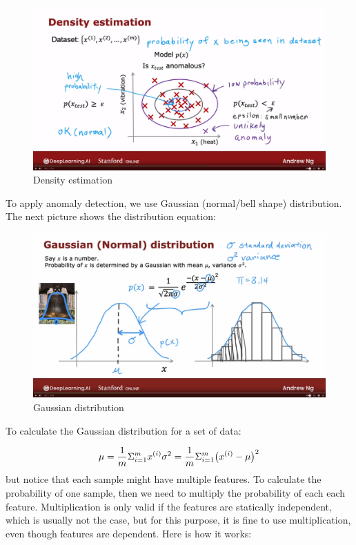 \documentclass[12pt]{report}
\begin{document}
\begin{figure}[H]
  \centering
  \includegraphics[trim =0.0cm 0.0cm 0.0cm 0.0cm, clip, scale=0.15]{pics/density.png}
  \caption{Density estimation}
\end{figure}

To apply anomaly detection, we use Gaussian (normal/bell shape) distribution. The next picture shows the distribution equation:

\begin{figure}[H]
  \centering
  \includegraphics[trim =0.0cm 0.0cm 0.0cm 0.0cm, clip, scale=0.15]{pics/gaussian.png}
  \caption{Gaussian distribution}
\end{figure}

To calculate the Gaussian distribution for a set of data:

\begin{equation}
  \mu = \frac{1}{m} \Sigma_{i=1}^{m} x ^ {(i)} \newline
  \sigma^2 = \frac{1}{m} \Sigma_{i=1}^{m} \big(x ^ {(i)} -\mu  \big)^2
\end{equation}
but notice that each sample might have multiple features. To calculate the probability of one sample, then we need to multiply the probability of each each feature. Multiplication is only valid if the features are statically independent, which is usually not the case, but for this purpose, it is fine to use multiplication, even though features are dependent. Here is how it works:
\end{document}
